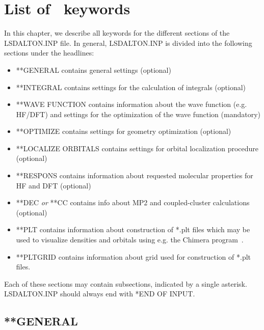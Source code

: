 
\chapter{List of \lsdalton\ keywords}\label{ch:keywords}

In this chapter, we describe all keywords for the different sections
of the LSDALTON.INP file. In general, LSDALTON.INP is divided into the following sections under
the headlines:
\begin{itemize}
\item **GENERAL contains general settings (optional)
\item **INTEGRAL contains settings for the calculation of integrals (optional)
\item **WAVE FUNCTION contains information about the wave function (e.g. HF/DFT) and settings
for the optimization of the wave function (mandatory)
\item **OPTIMIZE contains settings for geometry optimization (optional)
\item **LOCALIZE ORBITALS contains settings for orbital localization procedure (optional)
\item **RESPONS contains information about requested molecular properties for HF and DFT (optional)
\item **DEC \emph{or} **CC contains info about MP2 and coupled-cluster calculations (optional)
\item **PLT contains information about construction of *.plt files which may be used to visualize densities and orbitals using e.g. the Chimera program~\cite{chimera}.
\item **PLTGRID contains information about grid used for construction of *.plt files.
\end{itemize}
Each of these sections may contain subsections, indicated by a single asterisk. LSDALTON.INP
should always end with *END OF INPUT. 

\section{**GENERAL}\label{sec:general}

